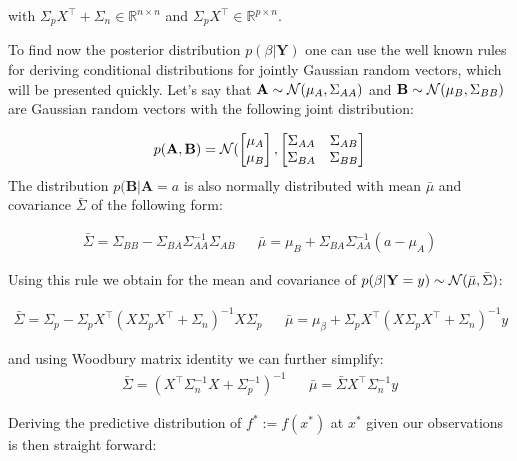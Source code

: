 with $\Sigma_p X^{\top} + \Sigma_n \in \mathbb{R}^{n\times n}$ and $\Sigma_p X^{\top} \in \mathbb{R}^{p\times n}$.

To find now the posterior distribution $p(\beta |  \mathbf{Y})$ one can use the well known rules for deriving conditional
distributions for jointly Gaussian random vectors, which will be presented quickly.
Let's say that $\mathbf{A} \sim \operatorname{\mathcal{N}}(\mu_A, \Sigma_{AA})$ and $\mathbf{B} \sim \operatorname{\mathcal{N}}(\mu_B, \Sigma_{BB})$ are
Gaussian random vectors with the following joint distribution:

\begin{gather}
    p(\mathbf{A}, \mathbf{B}) = \operatorname{\mathcal{N}}(
    \begin{bmatrix}
        \mu_A \\
        \mu_B
    \end{bmatrix},
    \begin{bmatrix}
        \Sigma_{AA} & \Sigma_{AB} \\
        \Sigma_{BA} & \Sigma_{BB}
    \end{bmatrix}
\end{gather}
The distribution $p(\mathbf{B} | \mathbf{A}=a$ is also normally distributed with mean $\bar{\mu}$ and covariance
$\bar{\Sigma}$ of the following form:

\begin{align}\label{def:conditioning}
    \bar{\Sigma} = \Sigma_{B B} - \Sigma_{B A} \Sigma_{A A}^{-1} \Sigma_{A B} & & \bar{\mu} = \mu_{B} + \Sigma_{BA} \Sigma_{AA}^{-1}(a - \mu_A)
\end{align}


Using this rule we obtain for the mean and covariance of $p(\beta | \mathbf{Y}=y) \sim \operatorname{\mathcal{N}}(\bar{\mu}, \bar{\Sigma})$:

\begin{align*}
    \bar{\Sigma} = \Sigma_{p} - \Sigma_p X^{\top}(X \Sigma_p X^{\top} + \Sigma_n)^{-1} X  \Sigma_p & & \bar{\mu} = \mu_{\beta} + \Sigma_p X^{\top}(X \Sigma_p X^{\top} + \Sigma_n)^{-1}y
\end{align*}

and using Woodbury matrix identity we can further simplify:
\begin{align*}
    \bar{\Sigma} = (X^{\top}\Sigma_n^{-1}X + \Sigma_p^{-1})^{-1} & & \bar{\mu} = \bar{\Sigma} X^{\top} \Sigma_n^{-1} y
\end{align*}

Deriving the predictive distribution of $f^{\ast} := f(x^{\ast})$ at $x^{\ast}$ given our
observations is then straight forward:

